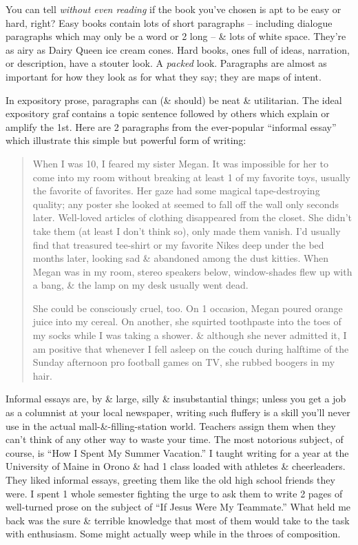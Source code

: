 \documentclass{article}
\numberwithin{equation}{section}
\begin{document}
You can tell \textit{without even reading} if the book you've chosen is apt to be easy or hard, right? Easy books contain lots of short paragraphs -- including dialogue paragraphs which may only be a word or 2 long -- \& lots of white space. They're as airy as Dairy Queen ice cream cones. Hard books, ones full of ideas, narration, or description, have a stouter look. A \textit{packed} look. Paragraphs are almost as important for how they look as for what they say; they are maps of intent.

In expository prose, paragraphs can (\& should) be neat \& utilitarian. The ideal expository graf contains a topic sentence followed by others which explain or amplify the 1st. Here are 2 paragraphs from the ever-popular ``informal essay'' which illustrate this simple but powerful form of writing:
\begin{quotation}
	When I was 10, I feared my sister Megan. It was impossible for her to come into my room without breaking at least 1 of my favorite toys, usually the favorite of favorites. Her gaze had some magical tape-destroying quality; any poster she looked at seemed to fall off the wall only seconds later. Well-loved articles of clothing disappeared from the closet. She didn't take them (at least I don't think so), only made them vanish. I'd usually find that treasured tee-shirt or my favorite Nikes deep under the bed months later, looking sad \& abandoned among the dust kitties. When Megan was in my room, stereo speakers below, window-shades flew up with a bang, \& the lamp on my desk usually went dead.
	
	She could be consciously cruel, too. On 1 occasion, Megan poured orange juice into my cereal. On another, she squirted toothpaste into the toes of my socks while I was taking a shower. \& although she never admitted it, I am positive that whenever I fell asleep on the couch during halftime of the Sunday afternoon pro football games on TV, she rubbed boogers in my hair.
\end{quotation}
Informal essays are, by \& large, silly \& insubstantial things; unless you get a job as a columnist at your local newspaper, writing such fluffery is a skill you'll never use in the actual mall-\&-filling-station world. Teachers assign them when they can't think of any other way to waste your time. The most notorious subject, of course, is ``How I Spent My Summer Vacation.'' I taught writing for a year at the University of Maine in Orono \& had 1 class loaded with athletes \& cheerleaders. They liked informal essays, greeting them like the old high school friends they were. I spent 1 whole semester fighting the urge to ask them to write 2 pages of well-turned prose on the subject of ``If Jesus Were My Teammate.'' What held me back was the sure \& terrible knowledge that most of them would take to the task with enthusiasm. Some might actually weep while in the throes of composition.
\end{document}

